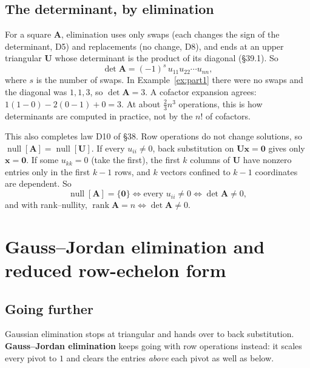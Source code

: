 \documentclass[11pt]{article}
\theoremstyle{plain}
\theoremstyle{definition}
\theoremstyle{remark}
\newcommand{\vc}[1]{\mathbf{#1}}
\newcommand{\mt}[1]{\mathbf{#1}}
\newcommand{\nullsp}[1]{\operatorname{null}[#1]}
\DeclareMathOperator{\rank}{rank}
\begin{document}
\subsection{The determinant, by elimination}
For a square $\mt{A}$, elimination uses only swaps (each changes the sign of
the determinant, D5) and replacements (no change, D8), and ends at an upper
triangular $\mt{U}$ whose determinant is the product of its diagonal (\S39.1). So
\[
  \boxed{\;\det\mt{A}=(-1)^{s}\,u_{11}u_{22}\cdots u_{nn},\;}
\]
where $s$ is the number of swaps. In Example~\ref{ex:part1} there were no swaps
and the diagonal was $1,1,3$, so $\det\mt{A}=3$. A cofactor expansion agrees:
$1(1-0)-2(0-1)+0=3$. At about $\frac23n^{3}$ operations, this is how
determinants are computed in practice, not by the $n!$ of cofactors.

This also completes law D10 of \S38. Row operations do not change solutions, so
$\nullsp{\mt{A}}=\nullsp{\mt{U}}$. If every $u_{ii}\neq0$, back substitution on
$\mt{U}\vc{x}=\vc{0}$ gives only $\vc{x}=\vc{0}$. If some $u_{kk}=0$ (take the
first), the first $k$ columns of $\mt{U}$ have nonzero entries only in the first
$k-1$ rows, and $k$ vectors confined to $k-1$ coordinates are dependent. So
\[
  \nullsp{\mt{A}}=\{\vc{0}\}
  \iff \text{every }u_{ii}\neq0
  \iff \det\mt{A}\neq0,
\]
and with rank--nullity, $\rank\mt{A}=n\iff\det\mt{A}\neq0$.

\section{Gauss--Jordan elimination and reduced row-echelon form}

\subsection{Going further}
Gaussian elimination stops at triangular and hands over to back substitution.
\textbf{Gauss--Jordan elimination} keeps going with row operations instead: it
scales every pivot to $1$ and clears the entries \emph{above} each pivot as well
as below.
\end{document}
